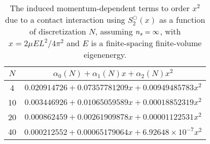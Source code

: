 \begin{table}
    \caption{The induced momentum-dependent terms to order $x^2$ due to a contact interaction using $S^\bigcirc_2(x)$ as a function of discretization $N$, assuming ${n_s}=\infty$, with $x=2\mu E L^2/4\pi^2$ and $E$ is a finite-spacing finite-volume eigenenergy.
    }
    \label{tab:induced terms in 2 d}
    \begin{tabular}{c|c}
    $N$ & $\alpha_0(N)+\alpha_1(N) x+\alpha_2(N) x^2$\\
    \hline
    4   &   $0.020914726 + 0.07357781209 x + 0.00949485783 x^2$\\
    10  &   $0.003446926 + 0.01065059589 x + 0.00018852319 x^2$\\
    20  &   $0.000862459 + 0.00261909878 x + 0.00001122531 x^2$ \\
    40  &   $0.000212552 + 0.00065179064 x + 6.92648\times10^{-7} x^2$ \\
\end{tabular}
\end{table}
